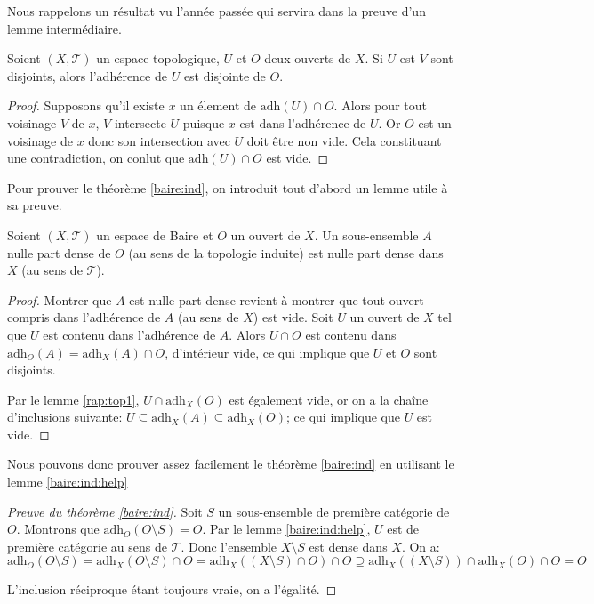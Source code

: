 Nous rappelons un résultat vu l'année passée qui servira dans la preuve
d'un lemme intermédiaire.
\begin{lem}\label{rap:top1}
  Soient $(X, \mathcal{T})$ un espace topologique, $U$ et $O$ deux ouverts
  de $X$. Si $U$ est $V$ sont disjoints, alors l'adhérence de $U$ est disjointe
  de $O$.
\end{lem}
\begin{proof}
  Supposons qu'il existe $x$ un élement de $\mathrm{adh}(U)\cap O$.
  Alors pour tout voisinage $V$ de $x$, $V$ intersecte $U$ puisque
  $x$ est dans l'adhérence de $U$. Or $O$ est un voisinage de $x$
  donc son intersection avec $U$ doit être non vide. Cela constituant
  une contradiction, on conlut que $\mathrm{adh}(U)\cap O$ est vide.
\end{proof}


Pour prouver le théorème \ref{baire:ind},
on introduit tout d'abord un lemme utile
à sa preuve.
\begin{lem}\label{baire:ind:help}
  Soient $(X, \mathcal{T})$ un espace de Baire et $O$ un ouvert de $X$.
  Un sous-ensemble $A$ nulle part dense de $O$ (au sens de la topologie
  induite) est nulle part dense dans $X$ (au sens de $\mathcal{T}$).
\end{lem}

\begin{proof}
  Montrer que $A$ est nulle part dense revient à montrer que
  tout ouvert compris dans l'adhérence de $A$ (au sens de $X$) est vide. Soit $U$
  un ouvert de $X$ tel que $U$ est contenu dans l'adhérence
  de $A$. Alors $U\cap O$ est contenu dans $\mathrm{adh}_O(A) =
  \mathrm{adh}_X(A)\cap O$, d'intérieur vide, ce qui implique que $U$ et $O$
  sont disjoints.

  Par le lemme \ref{rap:top1}, $U\cap \mathrm{adh}_X(O)$
  est également vide, or on a la chaîne d'inclusions suivante:
  $U\subseteq \mathrm{adh}_X(A)\subseteq \mathrm{adh}_X(O)$;
  ce qui implique que $U$ est vide.
\end{proof}

Nous pouvons donc prouver assez facilement le théorème \ref{baire:ind} en utilisant
le lemme \ref{baire:ind:help}

\begin{proof}[Preuve du théorème \ref{baire:ind}]
  Soit $S$ un sous-ensemble de première catégorie de $O$.
  Montrons que $\mathrm{adh}_O(O\setminus S) = O$.
  Par le lemme \ref{baire:ind:help}, $U$ est de première
  catégorie au sens de $\mathcal{T}$. Donc l'ensemble $X\setminus
  S$ est dense dans $X$. On a:
  $$\mathrm{adh}_O(O\setminus S) = \mathrm{adh}_X(O\setminus S)\cap O
  = \mathrm{adh}_X((X\setminus S)\cap O)\cap O\supseteq
  \mathrm{adh}_X((X\setminus S)) \cap \mathrm{adh}_X(O)\cap O = O$$

  L'inclusion réciproque étant toujours vraie, on a l'égalité.
\end{proof}

